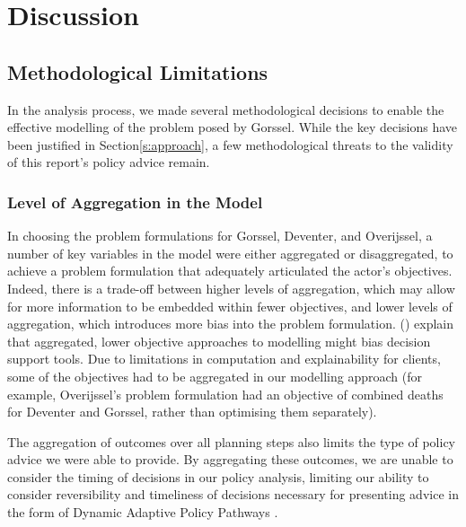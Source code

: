 \section{Discussion}
\label{s:discussion}




\subsection{Methodological Limitations}
In the analysis process, we made several methodological decisions to enable the effective modelling of the problem posed by Gorssel. While the key decisions have been justified in Section\ref{s:approach}, a few methodological threats to the validity of this report's policy advice remain.

\subsubsection{Level of Aggregation in the Model}
In choosing the problem formulations for Gorssel, Deventer, and Overijssel, a number of key variables in the model were either aggregated or disaggregated, to achieve a problem formulation that adequately articulated the actor's objectives. Indeed, there is a trade-off between higher levels of aggregation, which may allow for more information to be embedded within fewer objectives, and lower levels of aggregation, which introduces more bias into the problem formulation. \citeauthor{kasprzyk_battling_2016} (\citeyear{kasprzyk_battling_2016}) explain that aggregated, lower objective approaches to modelling might bias decision support tools. Due to limitations in computation and explainability for clients, some of the objectives had to be aggregated in our modelling approach (for example, Overijssel's problem formulation had an objective of combined deaths for Deventer and Gorssel, rather than optimising them separately).

The aggregation of outcomes over all planning steps also limits the type of policy advice we were able to provide. By aggregating these outcomes, we are unable to consider the timing of decisions in our policy analysis, limiting our ability to consider reversibility and timeliness of decisions necessary for presenting advice in the form of Dynamic Adaptive Policy Pathways \parencite{kwakkel_coping_2016,marchau_decision_2019}.

